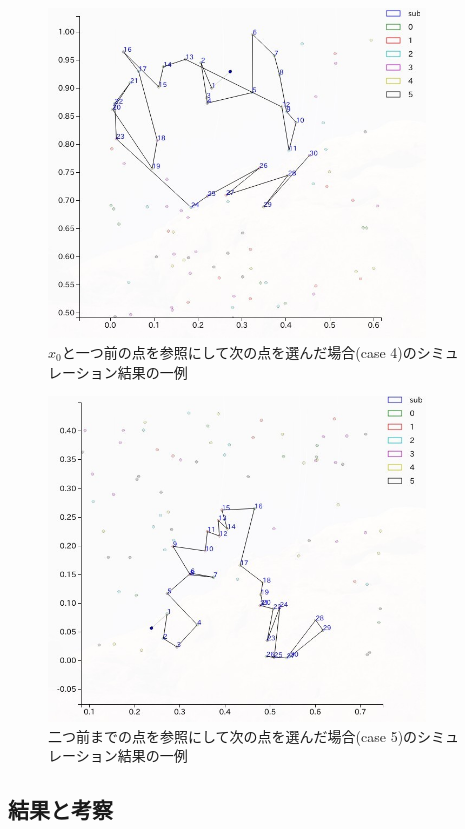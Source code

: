 \begin{figure}[H]
    \begin{center}
        \includegraphics[width=10cm]{../simple3/case_4.jpg}
        \caption{$x_{0}$と一つ前の点を参照にして次の点を選んだ場合(case 4)のシミュレーション結果の一例}
        \label{fig:f11}
    \end{center}
\end{figure}
\begin{figure}[H]
    \begin{center}
        \includegraphics[width=10cm]{../simple3/case_5.jpg}
        \caption{二つ前までの点を参照にして次の点を選んだ場合(case 5)のシミュレーション結果の一例}
        \label{fig:f12}
    \end{center}
\end{figure}

\subsection{結果と考察}


